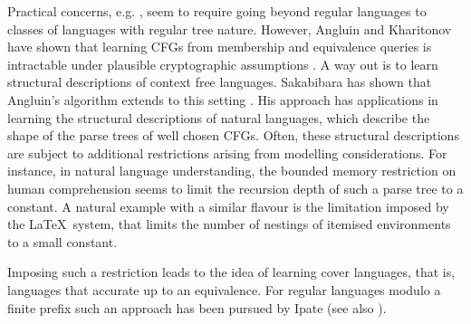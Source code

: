 \documentclass[preprint,12pt,english]{article}
\begin{document}
Practical concerns, e.g. \cite{kumar2006minimization}, seem to require going beyond regular languages to classes of languages with regular tree nature.  However, Angluin and Kharitonov have shown that learning CFGs from membership and equivalence queries is intractable under plausible cryptographic assumptions \cite{angluin1995won}. A way out is to learn structural descriptions of context free languages. Sakabibara has shown that Angluin's algorithm extends to this setting \cite{Sak:1990}. His approach has applications in learning the structural descriptions of natural languages, which describe the shape of the parse trees of well chosen CFGs. Often, these structural descriptions are subject to additional restrictions arising from modelling considerations. For instance, in natural language understanding, the bounded memory restriction on human comprehension seems to limit the recursion depth of such a parse tree to a constant. A natural example with a similar flavour is the limitation imposed by the \LaTeX\ system, that limits the number of nestings of itemised environments to a small constant.

Imposing such a restriction leads to the idea of learning cover languages, that is, languages that accurate up to an equivalence. For regular languages modulo a finite prefix such an approach has been pursued by Ipate \cite{Ipate:2012} (see also \cite{holzer2012equivalence}).
\end{document}
